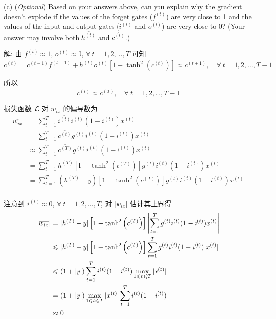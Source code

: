 \documentclass{article}
\begin{document}
(c) (\emph{Optional}) Based on your answers above, can you explain why the gradient doesn't explode if the values of the forget gates ($f^{(t)}$) are very close to 1 and the values of the input and output gates ($i^{(t)}$ and $o^{(t)}$) are very close to 0? (Your answer may involve both $\overline{h^{(t)}}$ and $\overline{c^{(t)}}$.)

解: 由 $f^{(t)}\approx1$, $o^{(t)}\approx0$, $\forall~t=1,2,\dots,T$ 可知
\begin{equation}
  \overline{c^{(t)}}
  =\overline{c^{(t+1)}}f^{(t+1)}
   +\overline{h^{(t)}}o^{(t)}\left[1-\tanh^2\left(c^{(t)}\right)\right]
  \approx\overline{c^{(t+1)}},\quad\forall~t=1,2,\dots,T-1
\end{equation}

所以
\begin{equation}
  \overline{c^{(t)}}\approx\overline{c^{(T)}},\quad\forall~t=1,2,\dots,T-1
\end{equation}

损失函数 $\mathcal{L}$ 对 $w_{ix}$ 的偏导数为
\begin{equation}
  \begin{aligned}
    \overline{w_{ix}}
    &=\sum_{t=1}^T\overline{i^{(t)}}i^{(t)}(1-i^{(t)})x^{(t)}\\
    &=\sum_{t=1}^T\overline{c^{(t)}}g^{(t)}i^{(t)}(1-i^{(t)})x^{(t)}\\
    &\approx\sum_{t=1}^T\overline{c^{(T)}}g^{(t)}i^{(t)}(1-i^{(t)})x^{(t)}\\
    &=\sum_{t=1}^T\overline{h^{(T)}}\left[1-\tanh^2\left(c^{(T)}\right)\right]g^{(t)}i^{(t)}(1-i^{(t)})x^{(t)}\\
    &=\sum_{t=1}^T(h^{(T)}-y)\left[1-\tanh^2\left(c^{(T)}\right)\right]g^{(t)}i^{(t)}(1-i^{(t)})x^{(t)}\\
  \end{aligned}
\end{equation}

注意到 $i^{(t)}\approx0$, $\forall~t=1,2,\dots,T$, 对 $|\overline{w_{ix}}|$ 估计其上界得
\begin{equation}
  \begin{aligned}
    |\overline{w_{ix}}|
    &=|h^{(T)}-y|\left[1-\tanh^2\left(c^{(T)}\right)\right]\left|\sum_{t=1}^Tg^{(t)}i^{(t)}(1-i^{(t)})x^{(t)}\right|\\
    &\leqslant|h^{(T)}-y|\left[1-\tanh^2\left(c^{(T)}\right)\right]\sum_{t=1}^Tg^{(t)}i^{(t)}(1-i^{(t)})|x^{(t)}|\\
    &\leqslant(1+|y|)\sum_{t=1}^Ti^{(t)}(1-i^{(t)})\max_{1\leqslant t\leqslant T}|x^{(t)}|\\
    &=(1+|y|)\max_{1\leqslant t\leqslant T}|x^{(t)}|\sum_{t=1}^Ti^{(t)}(1-i^{(t)})\\
    &\approx0
  \end{aligned}
\end{equation}
\end{document}
